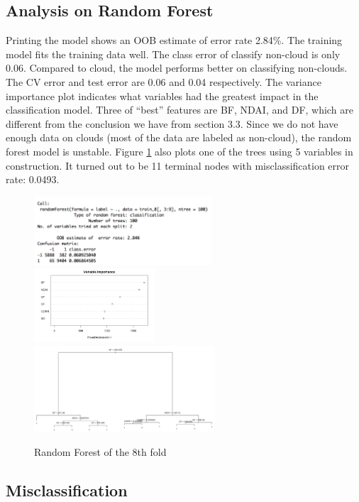 \documentclass[11pt]{article}
\begin{document}
\subsection{Analysis on Random Forest}

Printing the model shows an OOB estimate of error rate 2.84\%. The training model fits the training data well. The class error of classify non-cloud is only 0.06. Compared to cloud, the model performs better on classifying non-clouds. The CV error and test error are 0.06 and 0.04 respectively. The variance importance plot indicates what variables had the greatest impact in the classification model. Three of ``best'' features are BF, NDAI, and DF, which are different from the conclusion we have from section 3.3. Since we do not have enough data on clouds (most of the data are labeled as non-cloud), the random forest model is unstable. Figure \ref{fig:4-1-2} also plots one of the trees using 5 variables in construction. It turned out to be 11 terminal nodes with misclassification error rate: 0.0493. 

\begin{figure}[h]
\includegraphics[width=0.59\textwidth]{4-1-1.png}
\includegraphics[width=0.4\textwidth]{4-1-2.png}
\includegraphics[width=0.6\textwidth]{4-1-3.png}
\centering
\caption{Random Forest of the 8th fold}
\label{fig:4-1-2}
\centering
\end{figure}

\subsection{Misclassification}
\end{document}
